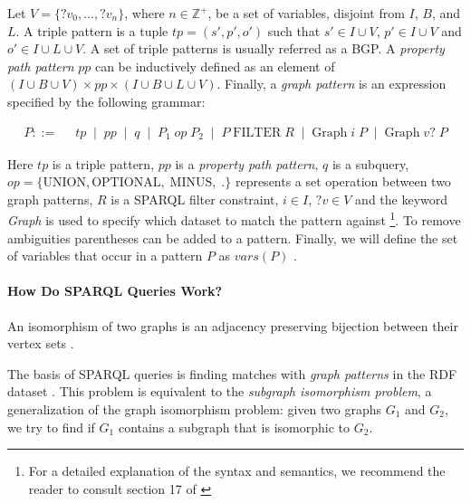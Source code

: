 \begin{definition}\label{ch2:definition:sparql-graph-pattern}
Let $V = \{?v_0,...,?v_ n\}$, where $n \in \mathbb{Z}^{+}$, be a set of variables, disjoint from $I$, $B$, and $L$. A triple pattern is a tuple $tp = (s', p', o')$ such that $s' \in I \cup V$, $p' \in I \cup V$ and $o' \in I \cup L \cup V$. A set of triple patterns is usually referred as a \gls{BGP}. A \emph{property path pattern} $pp$ can be inductively defined as an element of $(I \cup B \cup V) \times pp \times (I \cup B \cup L \cup V)$. Finally, a \emph{graph pattern} is an expression specified by the following grammar:

\begin{equation}
    \begin{split} 
    P ::= \;\; & tp \;\;\vert\;\; pp \;\;\vert\;\; q \;\;\vert\;\; P_1\; op \; P_2 \;\;\vert\;\; P\; \textrm{FILTER}\; R \;\;\vert\;\; \textrm{Graph}\; i\; P \;\;\vert\;\; \textrm{Graph}\; v?\; P
    \end{split}
\end{equation}


Here $tp$ is a triple pattern, $pp$ is a \emph{property path pattern}, $q$ is a subquery, $op = \{ \textrm{UNION}, \allowbreak \textrm{OPTIONAL}, \; \textrm{MINUS}, \; . \}$ represents a set operation between two graph patterns, $R$ is a \gls{SPARQL} filter constraint, $i \in I$, $?v \in V$ and the keyword \emph{Graph} is used to specify which dataset to match the pattern against \footnote{For a detailed explanation of the syntax and semantics, we recommend the reader to consult section 17 of \autocite{W3c2008-vf}}. To remove ambiguities parentheses can be added to a pattern. Finally, we will define the set of variables that occur in a pattern $P$ as $vars(P)$ \autocite{Picalausa2011-ca}.
\end{definition}

\paragraph{How Do SPARQL Queries Work?} An isomorphism of two graphs is an adjacency preserving bijection between their vertex sets \autocite{McKay2014-zb}.

The basis of \gls{SPARQL} queries is finding matches with \emph{graph patterns} in the \gls{RDF} dataset \autocite{Ladwig2013-xp, Cure2014-vm}. This problem is equivalent to the \emph{subgraph isomorphism problem}, a generalization of the graph isomorphism problem: given two graphs $G_1$ and $G_2$, we try to find if $G_1$ contains a subgraph that is isomorphic to $G_2$. 

